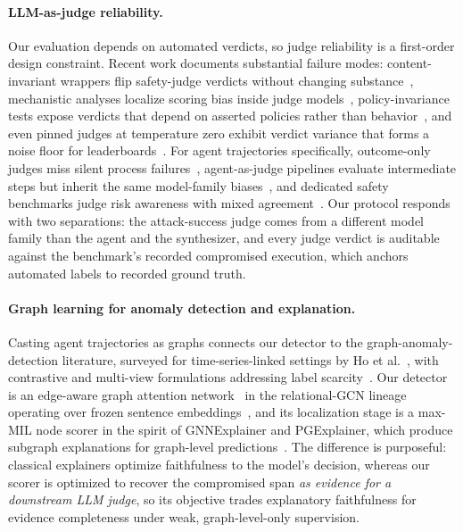 \paragraph{LLM-as-judge reliability.}
Our evaluation depends on automated verdicts, so judge reliability is a first-order design constraint. Recent work documents substantial failure modes: content-invariant wrappers flip safety-judge verdicts without changing substance~\cite{zhou2026style}, mechanistic analyses localize scoring bias inside judge models~\cite{xu2026inside}, policy-invariance tests expose verdicts that depend on asserted policies rather than behavior~\cite{weng2026beyond}, and even pinned judges at temperature zero exhibit verdict variance that forms a noise floor for leaderboards~\cite{ayyagari2026pinned}. For agent trajectories specifically, outcome-only judges miss silent process failures~\cite{mohammadi2026trajectoryjudge}, agent-as-judge pipelines evaluate intermediate steps but inherit the same model-family biases~\cite{zhuge2024agentasajudge}, and dedicated safety benchmarks judge risk awareness with mixed agreement~\cite{yuan2024rjudge}. Our protocol responds with two separations: the attack-success judge comes from a different model family than the agent and the synthesizer, and every judge verdict is auditable against the benchmark's recorded compromised execution, which anchors automated labels to recorded ground truth.

\paragraph{Graph learning for anomaly detection and explanation.}
Casting agent trajectories as graphs connects our detector to the graph-anomaly-detection literature, surveyed for time-series-linked settings by Ho et al.~\cite{ho2025graph}, with contrastive and multi-view formulations addressing label scarcity~\cite{liu2023revisiting}. Our detector is an edge-aware graph attention network~\cite{velikovi2017graph} in the relational-GCN lineage~\cite{schlichtkrull2017modeling} operating over frozen sentence embeddings~\cite{reimers2019sentencebert}, and its localization stage is a max-MIL node scorer in the spirit of GNNExplainer and PGExplainer, which produce subgraph explanations for graph-level predictions~\cite{ying2019gnnexplainer,luo2020parameterized}. The difference is purposeful: classical explainers optimize faithfulness to the model's decision, whereas our scorer is optimized to recover the compromised span \emph{as evidence for a downstream LLM judge}, so its objective trades explanatory faithfulness for evidence completeness under weak, graph-level-only supervision.
